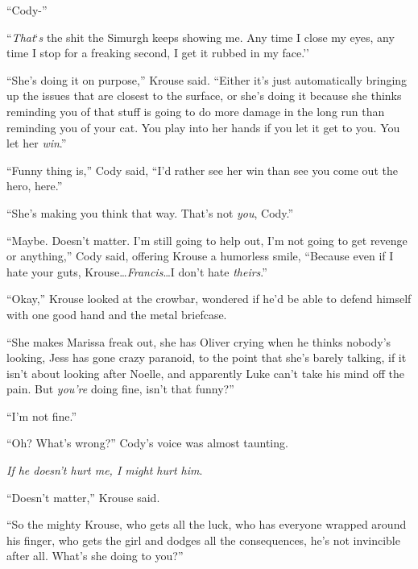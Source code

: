 ``Cody-''



``\emph{That}`\emph{s} the shit the Simurgh keeps showing me.  Any time I close my eyes, any time I stop for a freaking second, I get it rubbed in my face.''



``She's doing it on purpose,'' Krouse said.  ``Either it's just automatically bringing up the issues that are closest to the surface, or she's doing it because she thinks reminding you of that stuff is going to do more damage in the long run than reminding you of your cat.  You play into her hands if you let it get to you.  You let her \emph{win}.''



``Funny thing is,'' Cody said, ``I'd rather see her win than see you come out the hero, here.''



``She's making you think that way.  That's not \emph{you}, Cody.''



``Maybe.  Doesn't matter.  I'm still going to help out, I'm not going to get revenge or anything,'' Cody said, offering Krouse a humorless smile, ``Because even if I hate your guts, Krouse\ldots  \emph{Francis}\ldots I don't hate \emph{theirs}.''



``Okay,'' Krouse looked at the crowbar, wondered if he'd be able to defend himself with one good hand and the metal briefcase.



``She makes Marissa freak out, she has Oliver crying when he thinks nobody's looking, Jess has gone crazy paranoid, to the point that she's barely talking, if it isn't about looking after Noelle, and apparently Luke can't take his mind off the pain.  But \emph{you're} doing fine, isn't that funny?''



``I'm not fine.''



``Oh?  What's wrong?''  Cody's voice was almost taunting.



\emph{If he doesn't hurt me, I might hurt him}.



``Doesn't matter,'' Krouse said.



``So the mighty Krouse, who gets all the luck, who has everyone wrapped around his finger, who gets the girl and dodges all the consequences, he's not invincible after all.  What's she doing to you?''



